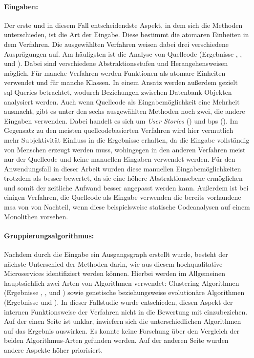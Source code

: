 \paragraph{Eingaben:} Der erste und in diesem Fall entscheidendste Aspekt, in dem sich die Methoden unterschieden, ist die Art der Eingabe.
Diese bestimmt die atomaren Einheiten in dem Verfahren.
Die ausgewählten Verfahren weisen dabei drei verschiedene Ausprägungen auf.
Am häufigsten ist die Analyse von Quellcode (Ergebnisse , ,  und ).
Dabei sind verschiedene Abstraktionsstufen und Her\-an\-ge\-hens\-wei\-sen möglich.
Für manche Verfahren werden Funktionen als atomare Einheiten verwendet und für manche Klassen.
In einem Ansatz werden außerdem gezielt \gls{sql}-Queries betrachtet, wodurch Beziehungen zwischen Datenbank-Objekten analysiert werden.
Auch wenn Quellcode als Eingabemöglichkeit eine Mehrheit ausmacht, gibt es unter den sechs ausgewählten Methoden noch zwei, die andere Eingaben verwenden.
Dabei handelt es sich um \emph{User Stories} () und \glspl{bp} ().
Im Gegensatz zu den meisten quellcodebasierten Verfahren wird hier vermutlich mehr Subjektivität Einfluss in die Ergebnisse erhalten, da die Eingabe vollständig von Menschen erzeugt werden muss, wohingegen in den anderen Verfahren meist nur der Quellcode und keine manuellen Eingaben verwendet werden.
Für den Anwendungsfall in dieser Arbeit wurden diese manuellen Eingabemöglichkeiten trotzdem als besser bewertet, da sie eine höhere Abstraktionsebene ermöglichen und somit der zeitliche Aufwand besser angepasst werden kann.
Außerdem ist bei einigen Verfahren, die Quellcode als Eingabe verwenden die bereits vorhandene \gls{msa} von \jf von Nachteil, wenn diese beispielsweise statische Codeanalysen auf einem Monolithen vorsehen.

\paragraph{Gruppierungsalgorithmus:} Nachdem durch die Eingabe ein Ausgangsgraph erstellt wurde, besteht der nächste Unterschied der Methoden darin, wie aus diesem hochqualitative Microservices identifiziert werden können.
Hierbei werden im Allgemeinen hauptsächlich zwei Arten von Algorithmen verwendet: Clustering-Algorithmen (Ergebnisse , ,  und ) sowie genetische beziehungsweise evolutionäre Algorithmen (Ergebnisse  und ).
In dieser Fallstudie wurde entschieden, diesen Aspekt der internen Funktionsweise der Verfahren nicht in die Bewertung mit einzubeziehen.
Auf der einen Seite ist unklar, inwiefern sich die unterschiedlichen Algorithmen auf das Ergebnis auswirken.
Es konnte keine Forschung über den Vergleich der beiden Algorithmus-Arten gefunden werden.
Auf der anderen Seite wurden andere Aspekte höher priorisiert.


